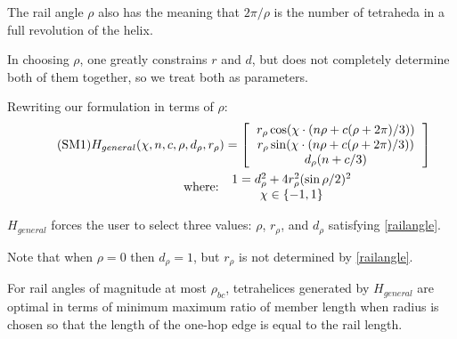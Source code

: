 \documentclass[review]{siamonline1116}
\newcommand\numberthis{\addtocounter{equation}{1}\tag{\theequation}}
\begin{document}
The rail angle $\rho$ also has the meaning that $2 \pi / \rho$ is the number of
tetraheda in a full revolution of the helix.

In choosing $\rho$, one greatly constrains $r$ and $d$, but does not completely
determine both of them together, so we treat both as parameters.

Rewriting our formulation in terms of $\rho$:
\begin{align*}
\numberthis  \label{eq:general}  
H_{general}(\chi,n,c,\rho,d_{\rho},r_{\rho}) &= 
 \left [
  \begin{tabular}{c}
   $ r_{\rho} \cos(\chi \cdot (n \rho + c(\rho +  2 \pi) /3)) $\\
   $ r_{\rho}  \sin(\chi \cdot (n \rho + c(\rho +  2 \pi) /3)) $\\
   $ d_{\rho} (n + c /3) $
  \end{tabular}
  \right ] \\
\text{where: } &
\begin{tabular}{c}
  $   1 = d_{\rho}^2 + 4 r_{\rho}^2 (\sin{ \rho / 2})^2 $ \\
    $\chi \in \{-1,1\}$ \\  
\end{tabular}
\end{align*} 


$H_{general}$ forces the user to select three values: $\rho$, $r_{\rho}$, and $d_{\rho}$ satisfying \eqref{railangle}.

Note that when $\rho = 0$ then $d_{\rho} = 1$, but $r_{\rho}$ is not determined by
\cref{railangle}.

\begin{theorem}
  \label{generalformulaoptimal}
  For rail angles of magnitude at most $\rho_{bc}$, tetrahelices generated by $H_{general}$ are optimal in terms of minimum maximum ratio of member length when radius is chosen so that
  the length of the one-hop edge is equal to the rail length.
\end{theorem}
\end{document}
